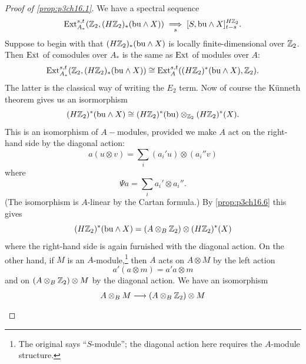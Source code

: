 \documentclass[../main]{subfiles}
\begin{document}
     \begin{proof}[Proof of \ref{prop:p3ch16.1}] We have a spectral sequence \begin{equation*}
            \mathrm{Ext}_{A_\ast}^{s,t}(\mathbb{Z}_2,(H\mathbb{Z}_2)_\ast(\mathrm{bu}\wedge X)) \underset{s}{\implies} [S,\mathrm{bu}\wedge X]_{t-s}^{H\mathbb{Z}_2}.
     \end{equation*}
      Suppose to begin with that $(H\mathbb{Z}_2)_{\ast}(\mathrm{bu}\wedge X)$ is locally finite-dimensional over $\mathbb{Z}_2$. Then $\mathrm{Ext}$ of comodules over $A_{\ast}$ is the same as $\mathrm{Ext}$ of modules over $A$: \begin{equation*}
          \mathrm{Ext}_{A_\ast}^{s,t}(\mathbb{Z}_2,(H\mathbb{Z}_2)_\ast(\mathrm{bu}\wedge X))\cong \mathrm{Ext}_{A}^{s,t}((H\mathbb{Z}_2)^\ast(\mathrm{bu}\wedge X),\mathbb{Z}_2).
      \end{equation*}
      The latter is the classical way of writing the $E_{2}$ term. Now of course the Künneth theorem gives us an isormorphism \begin{equation*}
          (H\mathbb{Z}_2)^{\ast}(\mathrm{bu} \wedge X) \cong (H\mathbb{Z}_2)^{\ast}(\mathrm{bu})\otimes_{\mathbb{Z}_2}(H\mathbb{Z}_2)^{\ast}(X).
      \end{equation*}
      This is an isomorphism of $A-$modules, provided we make $A$ act on the
right-hand side by the diagonal action: \begin{equation*}
    a(u\otimes v)= \sum_{i}(a_{i}'u)\otimes(a_{i}''v)
\end{equation*}
where \begin{equation*}
    \Psi a = \sum_{i} a_{i}' \otimes a_{i}''.
\end{equation*}
(The isomorphism is $A$-linear by the Cartan formula.) By \ref{prop:p3ch16.6} this gives \begin{equation*}
    (H\mathbb{Z}_2)^{\ast}(\mathrm{bu} \wedge X)= (A \otimes_{B} \mathbb{Z}_2)\otimes(H\mathbb{Z}_2)^{\ast}(X) 
\end{equation*}
where the right-hand side is again furnished with the diagonal action. On
the other hand, if $M$ is an $A$-module,\footnote{The original says ``$S$-module''; the diagonal action here requires the $A$-module structure.} then $A$ acts on $A\otimes M$ by the left action \begin{equation*}
 a'(a\otimes m )= a'a \otimes m 
\end{equation*}
and on $(A \otimes_{B} \mathbb{Z}_2)\otimes M$ by the diagonal action. We have an isomorphism \begin{equation*}
    A \otimes_{B} M \lar{} (A \otimes_{B} \bZ_2)\otimes M
\end{equation*}

\end{proof}
\end{document}

